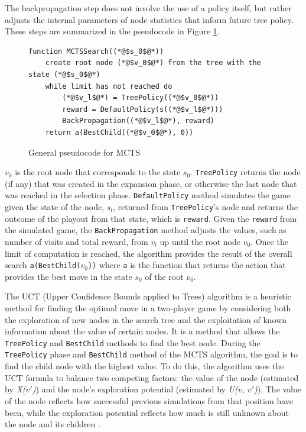 The backpropagation step does not involve the use of a policy itself, but rather adjusts the internal parameters of node statistics that inform future tree policy. These steps are summarized in the pseudocode in Figure \ref{fig:mctsGeneral}.


\begin{figure}[h]
\captionsetup{justification=centering}
\begin{lstlisting}
function MCTSSearch((*@$s_0$@*))
    create root node (*@$v_0$@*) from the tree with the state (*@$s_0$@*)
    while limit has not reached do
        (*@$v_l$@*) = TreePolicy((*@$v_0$@*))
        reward = DefaultPolicy(s((*@$v_l$@*)))
        BackPropagation((*@$v_l$@*), reward)
    return a(BestChild((*@$v_0$@*), 0))
\end{lstlisting}
\caption{General pseudocode for MCTS}
\label{fig:mctsGeneral}
\end{figure}

$v_0$ is the root node that corresponds to the state $s_0$. \texttt{TreePolicy} returns the node (if any) that was created in the expansion phase, or otherwise the last node that was reached in the selection phase. \texttt{DefaultPolicy} method simulates the game given the state of the node, $s_l$, returned from \texttt{TreePolicy}'s node and returns the outcome of the playout from that state, which is \texttt{reward}. Given the \texttt{reward} from the simulated game, the \texttt{BackPropagation} method adjusts the values, such as number of visits and total reward, from $v_l$ up until the root node $v_0$. Once the limit of computation is reached, the algorithm provides the result of the overall search \texttt{a(BestChild($v_0$))} where \texttt{a} is the function that returns the action that provides the best move in the state $s_0$ of the root $v_0$.

The UCT (Upper Confidence Bounds applied to Trees) algorithm is a heuristic method for finding the optimal move in a two-player game by considering both the exploration of new nodes in the search tree and the exploitation of known information about the value of certain nodes. It is a method that allows the \texttt{TreePolicy} and \texttt{BestChild} methods to find the best node. During the \texttt{TreePolicy} phase and \texttt{BestChild} method of the MCTS algorithm, the goal is to find the child node with the highest value. To do this, the algorithm uses the UCT formula to balance two competing factors: the value of the node (estimated by \textit{X($v'$)}) and the node's exploration potential (estimated by \textit{U($v$, $v'$)}). The value of the node reflects how successful previous simulations from that position have been, while the exploration potential reflects how much is still unknown about the node and its children \citep{MCTSSurvey}.


